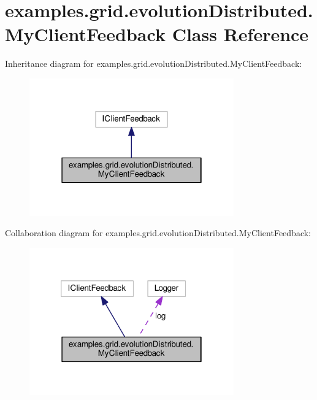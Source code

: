 \hypertarget{classexamples_1_1grid_1_1evolution_distributed_1_1_my_client_feedback}{\section{examples.\-grid.\-evolution\-Distributed.\-My\-Client\-Feedback Class Reference}
\label{classexamples_1_1grid_1_1evolution_distributed_1_1_my_client_feedback}
}


Inheritance diagram for examples.\-grid.\-evolution\-Distributed.\-My\-Client\-Feedback\-:
\nopagebreak
\begin{figure}[H]
\begin{center}
\leavevmode
\includegraphics[width=250pt]{classexamples_1_1grid_1_1evolution_distributed_1_1_my_client_feedback__inherit__graph}
\end{center}
\end{figure}


Collaboration diagram for examples.\-grid.\-evolution\-Distributed.\-My\-Client\-Feedback\-:
\nopagebreak
\begin{figure}[H]
\begin{center}
\leavevmode
\includegraphics[width=250pt]{classexamples_1_1grid_1_1evolution_distributed_1_1_my_client_feedback__coll__graph}
\end{center}
\end{figure}
